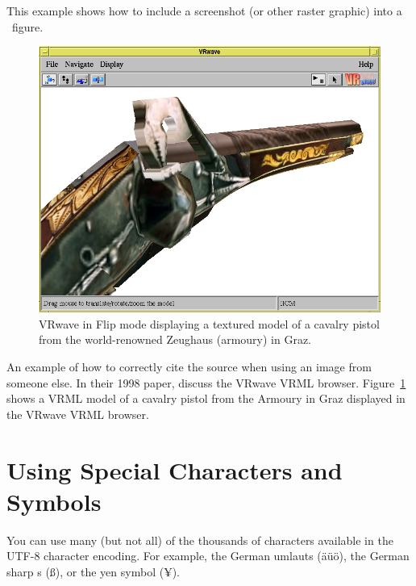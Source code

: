 This example shows how to include a screenshot (or other raster
graphic) into a \LaTeXe\ figure.

\begin{figure}[tp]
\centering
\includegraphics[keepaspectratio,width=\linewidth,height=\halfh]
{images/pist.png}

\caption[VRwave in Flip Mode]
{%
VRwave in Flip mode displaying a textured model of a cavalry pistol
from the world-renowned Zeughaus (armoury) in Graz.
}
\label{fig:Pistol}
\end{figure}


An example of how to correctly cite the source when using an image
from someone else. In their 1998 paper, \textcite{Andrews-VRwave} discuss
the VRwave VRML browser. Figure~\ref{fig:Pistol} shows a VRML model of
a cavalry pistol from the Armoury in Graz displayed in the VRwave VRML
browser.





\section{Using Special Characters and Symbols}

You can use many (but not all) of the thousands of characters
available in the UTF-8 \parencites{Wikipedia-UTF8}{Unicode-Charts}
character encoding. For example, the German umlauts (äüö), the German
sharp s (ß), or the yen symbol (¥).

